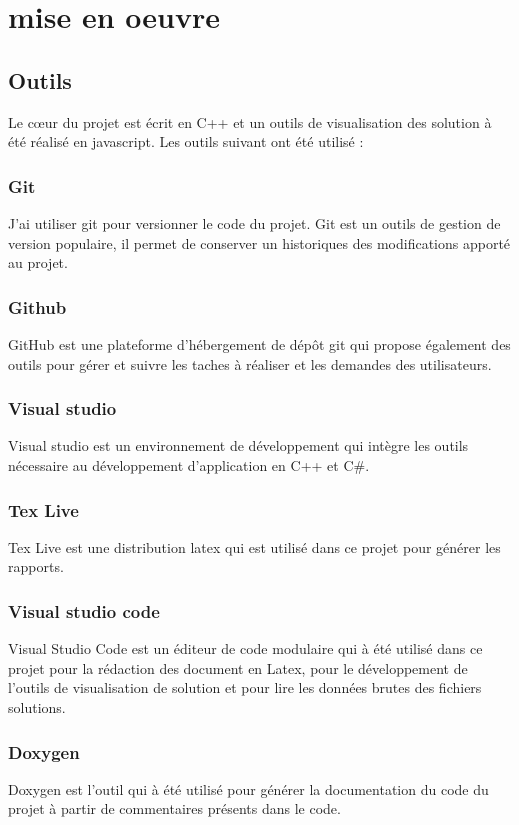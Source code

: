 \chapter{mise en oeuvre}
\label{appendix:mise_en_oeuvre}

\section{Outils}


Le cœur du projet est écrit en C++ et un outils de visualisation des solution à été réalisé en javascript.
Les outils suivant ont été utilisé :
\subsection{Git}
J'ai utiliser git pour versionner le code du projet.
Git est un outils de gestion de version populaire, il permet de conserver un historiques des modifications apporté au projet.
\subsection{Github}
GitHub est une plateforme d'hébergement de dépôt git qui propose également des outils pour gérer et suivre les taches à réaliser et les demandes des utilisateurs.
\subsection{Visual studio}
Visual studio est un environnement de développement qui intègre les outils nécessaire au développement d'application en C++ et C\#.
\subsection{Tex Live}
Tex Live est une distribution latex qui est utilisé dans ce projet pour générer les rapports.
\subsection{Visual studio code}
Visual Studio Code est un éditeur de code modulaire qui à été utilisé dans ce projet pour la rédaction des document en Latex, pour le développement de l'outils de visualisation de solution et pour lire les données brutes des fichiers solutions.
\subsection{Doxygen}
Doxygen est l'outil qui à été utilisé pour générer la documentation du code du projet à partir de commentaires présents dans le code.
